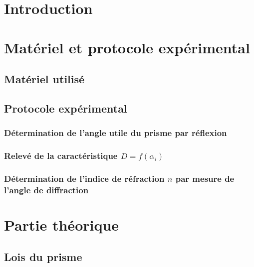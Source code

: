 \documentclass[a4paper,12pt]{article}
\begin{document}



\newpage
\tableofcontents
\newpage

\section*{Introduction}


\section{Matériel et protocole expérimental}


\subsection{Matériel utilisé}


\subsection{Protocole expérimental}


\subsubsection{Détermination de l’angle utile du prisme par réflexion}


\subsubsection{Relevé de la caractéristique \texorpdfstring{$D = f(\alpha_i)$}{D en fonction de l'angle alpha}}


\subsubsection{Détermination de l'indice de réfraction \texorpdfstring{$n$}{n} par mesure de l'angle de diffraction}


\section{Partie théorique}


\subsection{Lois du prisme}

\end{document}
